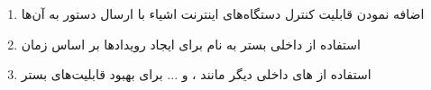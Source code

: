 \begin{enumerate}

	\item اضافه نمودن قابلیت کنترل دستگاه‌های اینترنت اشیاء با ارسال دستور به آن‌ها
	
	\item استفاده از  داخلی بستر  به نام  برای ایجاد رویدادها بر اساس زمان
	
	\item استفاده از  های داخلی دیگر مانند ،  و ... برای بهبود قابلیت‌های بستر

\end{enumerate}

